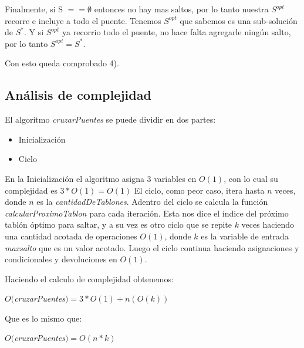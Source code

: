 Finalmente, si S $== \emptyset$ entonces no hay mas saltos, por lo tanto nuestra $S^{opt}$ recorre e incluye a todo el puente.
Tenemos $S^{opt}$  que sabemos es una sub-soluci\'on de $S^{*}$. Y si $S^{opt}$ ya recorrio todo el puente, no hace falta agregarle ning\'un salto, por lo tanto $S^{opt} =S^{*}$.  

Con esto queda comprobado 4).
\\
\subsection{An\'alisis de complejidad}
El algoritmo \textit{cruzarPuentes} se puede dividir en dos partes:
\begin{itemize}
\item Inicialización
\item Ciclo
\end{itemize}

En la Inicialización el algoritmo asigna 3 variables en $O(1)$, con lo cual su complejidad es $3*O(1) = O(1)$
El ciclo, como peor caso, itera hasta $n$ veces, donde $n$ es la \textit{cantidadDeTablones}. Adentro del ciclo se calcula la función \textit{calcularProximoTablon} para cada iteración. Esta nos dice el índice del próximo tablón óptimo para saltar, y a su vez es otro ciclo que se repite $k$ veces haciendo una cantidad acotada de operaciones $O(1)$, donde $k$ es la variable de entrada \textit{maxsalto} que es un valor acotado.
Luego el ciclo continua haciendo asignaciones y condicionales y devoluciones en $O(1)$.

Haciendo el calculo de complejidad obtenemos:

$O($\textit{cruzarPuentes}$) = 3*O(1) + n(O(k))$

Que es lo mismo que:

$O($\textit{cruzarPuentes}$) = O(n*k)$


